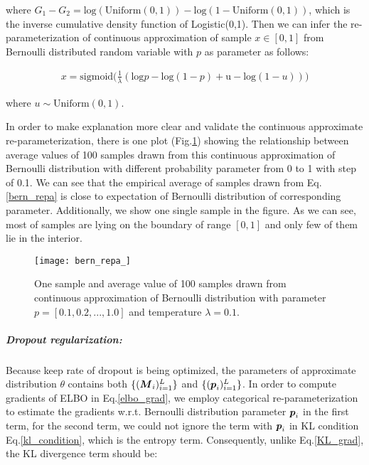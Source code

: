 where $G_1 - G_2 = \text{log}(\text{Uniform}(0,1)) - \text{log}(1-\text{Uniform}(0,1))$, which is the inverse cumulative density function of Logistic(0,1).
Then we can infer the re-parameterization of continuous approximation of sample $x \in [0, 1]$ from Bernoulli distributed random variable with $p$ as parameter as follows:

\begin{equation}\label{bern_repa}
\begin{aligned}
x = \text{sigmoid}\big(
\frac{1}{\lambda} (\text{log}p - \text{log}(1-p) + \text{u} - \text{log}(1-u)) 
\big)
\end{aligned}
\end{equation}

where $u \sim \text{Uniform}(0,1)$. 

In order to make explanation more clear and validate the continuous approximate re-parameterization, there is one plot (Fig.\ref{fig:bern_repa}) showing the relationship between average values of 100 samples drawn from this continuous approximation of Bernoulli distribution with different probability parameter from 0 to 1 with step of 0.1. We can see that the empirical average of samples drawn from Eq.\ref{bern_repa} is close to expectation of Bernoulli distribution of corresponding parameter. Additionally, we show one single sample in the figure. As we can see, most of samples are lying on the boundary of range $[0,1]$ and only few of them lie in the interior.
\begin{figure}[h!]
	\begin{center}
		\texttt{[image: bern\_repa\_]}
		\caption{One sample and average value of 100 samples drawn from continuous approximation of Bernoulli distribution with parameter $p = [0.1, 0.2, ..., 1.0]$ and temperature $ \lambda =0.1$.}		
		\label{fig:bern_repa}
	\end{center}
\end{figure}

\subparagraph{Dropout regularization:}
Because keep rate of dropout is being optimized, the parameters of approximate distribution $\theta$ contains both $\{ (\boldsymbol M_i)_{i=1}^{L} \}$ and $\{(\boldsymbol p_i)_{i=1}^{L} \}$. In order to compute gradients of ELBO in Eq.\ref{elbo_grad}, we employ categorical re-parameterization to estimate the gradients w.r.t. Bernoulli distribution parameter $\boldsymbol p_i$ in the first term, for the second term, we could not ignore the term with $\boldsymbol p_i$ in KL condition Eq.\ref{kl_condition}, which is the entropy term. Consequently, unlike Eq.\ref{KL_grad}, the KL divergence term should be:

